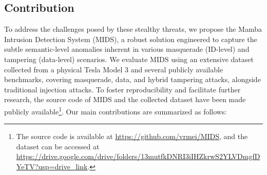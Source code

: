 \documentclass[lettersize,journal]{IEEEtran}
\begin{document}
\subsection{Contribution}
To address the challenges posed by these stealthy threats, we propose the Mamba Intrusion Detection System (MIDS), a robust solution engineered to capture the subtle semantic-level anomalies inherent in various masquerade (ID-level) and tampering (data-level) scenarios. We evaluate MIDS using an extensive dataset collected from a physical Tesla Model 3 and several publicly available benchmarks, covering masquerade, data, and hybrid tampering attacks, alongside traditional injection attacks. To foster reproducibility and facilitate further research, the source code of MIDS and the collected dataset have been made publicly available\footnote{The source code is available at \url{https://github.com/vrmei/MIDS}, and the dataset can be accessed at \url{https://drive.google.com/drive/folders/13mutfkDNRI3iIHZkrwS2YLVDmgfDYeTV?usp=drive_link}.}. Our main contributions are summarized as follows:
\end{document}
